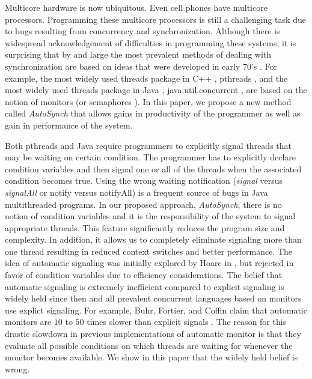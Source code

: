 \documentclass[preprint]{sigplanconf}
\begin{document}
Multicore hardware is now ubiquitous. Even cell phones have
multicore processors. Programming these multicore processors is
still a challenging task due to
bugs resulting from concurrency and synchronization.
Although there is widespread acknowledgement of difficulties 
in programming these systems, it is surprising that by and large the most 
prevalent methods of dealing with synchronization are based on ideas that were 
developed in early 70's \cite{dijk68, hoa74, bh75a}. For 
example, the most widely used threads package in C++ \cite{stro97}, 
pthreads \cite{bute97}, and the most widely used threads package in Java \cite{gjs00}, 
java.util.concurrent \cite{lea05}, are based
on the notion of monitors \cite{hoa74, bh75a}(or semaphores 
\cite{dijk65, dijk68}). 
In this paper, we propose a new method called {\em AutoSynch} 
that allows gains in productivity of the programmer as well as gain in
performance of the system.

Both pthreads and Java require programmers to explicitly
signal threads that may be waiting on certain condition. The programmer
has to explicitly declare condition variables and then signal one
or all of the threads when the associated condition becomes true.
Using the wrong waiting notification ({\em signal} versus {\em signalAll} or notify
versus notifyAll) is a frequent source of bugs in Java multithreaded
programs. In our proposed approach, {\em AutoSynch}, there is no notion of condition variables
and it is the responsibility of the system to signal appropriate threads.
This feature significantly reduces the program size and complexity.
In addition, it allows us to completely eliminate signaling more than 
one thread resulting in reduced context switches and better performance.
The idea of automatic signaling was initially explored by Hoare in \cite{hoa74},
but rejected in favor of condition variables due to efficiency considerations.
The belief that automatic signaling is extremely inefficient compared to
explicit signaling is widely held since then and
all prevalent concurrent languages based on monitors use
explict signaling.
For example, Buhr, Fortier, and Coffin claim that automatic monitors are $10$ to $50$ times
slower than explicit signals \cite{bfc95}. The reason for this drastic slowdown in 
previous implementations of automatic monitor  is that they evaluate
all possible conditions on which threads are waiting for whenever the monitor
becomes available. We show in this
paper that the widely held belief is wrong.
\end{document}
